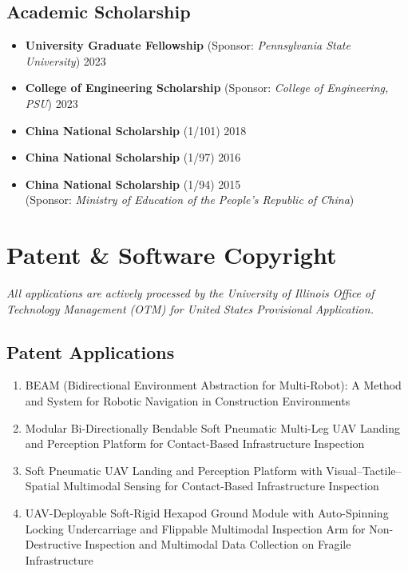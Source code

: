 \documentclass[11pt,a4paper]{article}
\newcommand{\entrytitle}[1]{\textbf{#1}}
\newcommand{\entrydetail}[1]{\textit{#1}}
\begin{document}
\subsection*{Academic Scholarship}
\begin{itemize}[nosep, leftmargin=1.5em]
    \item \entrytitle{University Graduate Fellowship} (Sponsor: \entrydetail{Pennsylvania State University}) \hfill 2023
    \item \entrytitle{College of Engineering Scholarship} (Sponsor: \entrydetail{College of Engineering, PSU}) \hfill 2023
    \item \entrytitle{China National Scholarship} (1/101) \hfill 2018
    \item \entrytitle{China National Scholarship} (1/97) \hfill 2016
    \item \entrytitle{China National Scholarship} (1/94) \hfill 2015 \\
    (Sponsor: \entrydetail{Ministry of Education of the People's Republic of China})
\end{itemize}

\section{Patent \& Software Copyright}

\textit{All applications are actively processed by the University of Illinois Office of Technology Management (OTM) for United States Provisional Application.}

\subsection*{Patent Applications}
\begin{enumerate}[nosep, leftmargin=1.8em]
    \item BEAM (Bidirectional Environment Abstraction for Multi-Robot): A Method and System for Robotic Navigation in Construction Environments
    \item Modular Bi-Directionally Bendable Soft Pneumatic Multi-Leg UAV Landing and Perception Platform for Contact-Based Infrastructure Inspection
    \item Soft Pneumatic UAV Landing and Perception Platform with Visual--Tactile--Spatial Multimodal Sensing for Contact-Based Infrastructure Inspection
    \item UAV-Deployable Soft-Rigid Hexapod Ground Module with Auto-Spinning Locking Undercarriage and Flippable Multimodal Inspection Arm for Non-Destructive Inspection and Multimodal Data Collection on Fragile Infrastructure
\end{enumerate}
\end{document}
